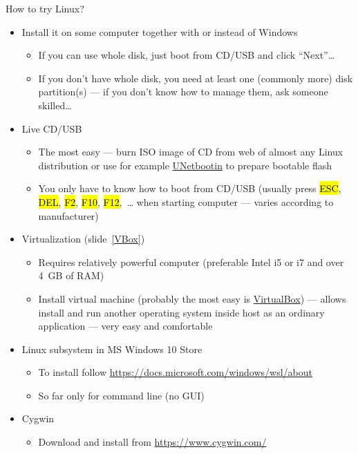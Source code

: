 \documentclass[compress, ucs, xelatex, 11pt, xcolor=svgnames,
  hyperref={
    bookmarks=true,
    unicode=true,
    colorlinks=true,
    pdftitle={Linux, command line and MetaCentrum},
    plainpages=false,
    pdfauthor={Vojtech Zeisek},
    pdfsubject={Course about use of Linux command line, writing shell scripts and using MetaCentrum of CESNET},
    pdfcreator={XeLaTeX},
    pdfkeywords={Linux, GNU, BASH, shell, command line, MetaCentrum},
    linkcolor=DarkRed,
    anchorcolor=DarkBlue,
    citecolor=Indigo,
    filecolor=NavyBlue,
    menucolor=DarkMagenta,
    urlcolor=DarkBlue,
    pdftex},
  url={hyphens, lowtilde} %
  ]{beamer}
\renewcommand{\texttt}[1]{\hl{\ttfamily #1}}
\begin{document}
\begin{frame}[allowframebreaks]{How to try Linux?}
  \begin{itemize}
    \item Install it on some computer together with or instead of Windows
    \begin{itemize}
      \item If you can use whole disk, just boot from CD/USB and click ``Next''\ldots
      \item If you don't have whole disk, you need at least one (commonly more) disk partition(s) --- if you don't know how to manage them, ask someone skilled\ldots
    \end{itemize}
    \item Live CD/USB
    \begin{itemize}
      \item The most easy --- burn ISO image of CD from web of almost any Linux distribution or use for example \href{https://unetbootin.github.io/}{UNetbootin} to prepare bootable flash
      \item You only have to know how to boot from CD/USB (usually press \texttt{ESC}, \texttt{DEL}, \texttt{F2}, \texttt{F10}, \texttt{F12},~\ldots{ }when starting computer --- varies according to manufacturer)
    \end{itemize}
    \item Virtualization (slide~\ref{VBox})
    \begin{itemize}
      \item Requires relatively powerful computer (preferable Intel i5 or i7 and over 4~GB of RAM)
      \item Install virtual machine (probably the most easy is \href{https://www.virtualbox.org/}{VirtualBox}) --- allows install and run another operating system inside host as an ordinary application --- very easy and comfortable
    \end{itemize}
    \item Linux subsystem in MS Windows 10 Store
    \begin{itemize}
      \item To install follow \url{https://docs.microsoft.com/windows/wsl/about}
      \item So far only for command line (no GUI)
    \end{itemize}
    \item Cygwin
    \begin{itemize}
      \item Download and install from \url{https://www.cygwin.com/}

\end{itemize}
\end{itemize}
\end{frame}
\end{document}
